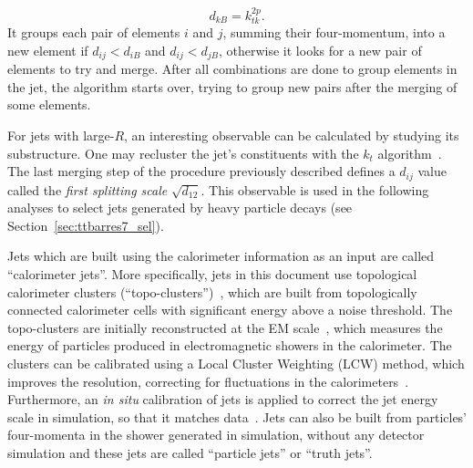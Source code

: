 \begin{equation}
\displaystyle
d_{kB} = k_{tk}^{2p}.
\label{eq:jet_dkb}
\end{equation}
It groups each pair of elements $i$ and $j$, summing their four-momentum, into a new element if $d_{ij} < d_{iB}$ and $d_{ij} < d_{jB}$, otherwise it looks for a new
pair of elements to try and merge. After all combinations are done to group elements in the jet, the algorithm starts over, trying to group new pairs after the
merging of some elements.

For jets with large-$R$, 
an interesting observable
can be calculated by studying its substructure.
One may recluster the jet's
constituents with the $k_t$ algorithm~\cite{ktalgo,antiktalgo}.
The last merging step of the procedure previously described
defines a $d_{ij}$ value called
the \emph{first splitting scale} $\sqrt{d_{12}}$. This
observable is used in the following analyses to select jets generated
by heavy particle decays (see Section~\ref{sec:ttbarres7_sel}).

Jets which are built using the calorimeter information as an input are called ``calorimeter jets''. More specifically, jets in this document
use topological calorimeter clusters (``topo-clusters'')~\cite{ttjets_jer}, which are built from topologically connected calorimeter cells with significant energy
above a noise threshold. The topo-clusters are initially reconstructed at the EM scale~\cite{atlas_larcal}, which measures the energy of particles produced in
electromagnetic showers in the calorimeter. The clusters can be calibrated using a Local Cluster Weighting (LCW) method, which improves the resolution, correcting
for fluctuations in the calorimeters~\cite{jes2011}. Furthermore, an \emph{in situ} calibration of jets is applied to correct the jet energy scale
in simulation, so that it matches data~\cite{jes2011}.
Jets can also be built from particles' four-momenta in the shower generated in simulation, without any detector simulation and these jets are called ``particle jets'' or
``truth jets''.

